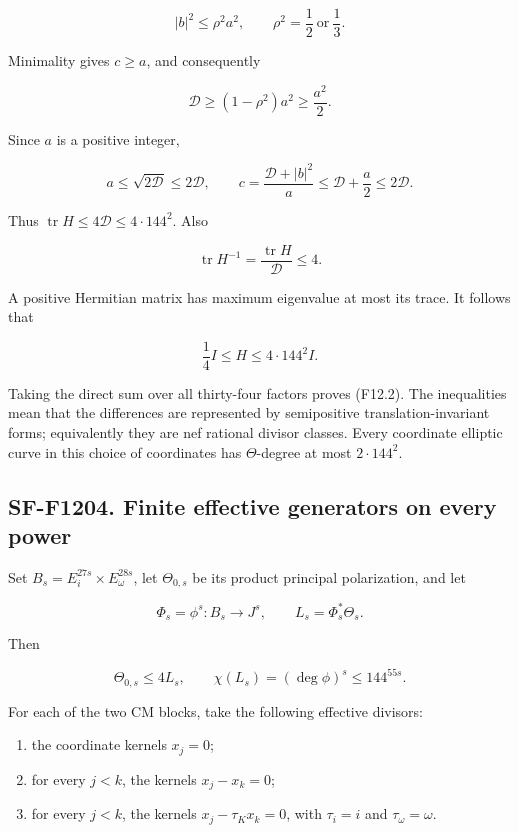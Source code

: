 \[
 |b|^2\le\rho^2a^2,\qquad
 \rho^2=\frac12\ \text{or}\ \frac13.
\]

Minimality gives \(c\ge a\), and consequently

\[
 \mathcal D\ge(1-\rho^2)a^2\ge\frac{a^2}{2}.
\]

Since \(a\) is a positive integer,

\[
 a\le\sqrt{2\mathcal D}\le2\mathcal D,\qquad
 c=\frac{\mathcal D+|b|^2}{a}
    \le\mathcal D+\frac a2\le2\mathcal D.
 \tag{F12.12}
\]

Thus \(\operatorname{tr}H\le4\mathcal D\le4\cdot144^2\). Also

\[
 \operatorname{tr}H^{-1}
   =\frac{\operatorname{tr}H}{\mathcal D}\le4.
\]

A positive Hermitian matrix has maximum eigenvalue at most its trace. It
follows that

\[
 \frac14I\le H\le4\cdot144^2I.
 \tag{F12.13}
\]

Taking the direct sum over all thirty-four factors proves (F12.2). The
inequalities mean that the differences are represented by semipositive
translation-invariant forms; equivalently they are nef rational divisor
classes. Every coordinate elliptic curve in this choice of coordinates
has \(\Theta\)-degree at most \(2\cdot144^2\).

\subsection{SF-F1204. Finite effective generators on every
power}\label{SF-F1204}

Set \(B_s=E_i^{27s}\times E_\omega^{28s}\), let \(\Theta_{0,s}\) be its
product principal polarization, and let

\[
 \Phi_s=\phi^s:B_s\longrightarrow J^s,\qquad
 L_s=\Phi_s^*\Theta_s.
\]

Then

\[
 \Theta_{0,s}\le4L_s,\qquad
 \chi(L_s)=(\deg\phi)^s\le144^{55s}.
 \tag{F12.14}
\]

For each of the two CM blocks, take the following effective divisors:

\begin{enumerate}
\def\labelenumi{\arabic{enumi}.}
\item
  the coordinate kernels \(x_j=0\);
\item
  for every \(j<k\), the kernels \(x_j-x_k=0\);
\item
  for every \(j<k\), the kernels \(x_j-\tau_Kx_k=0\), with \(\tau_i=i\)
  and \(\tau_\omega=\omega\).
\end{enumerate}


